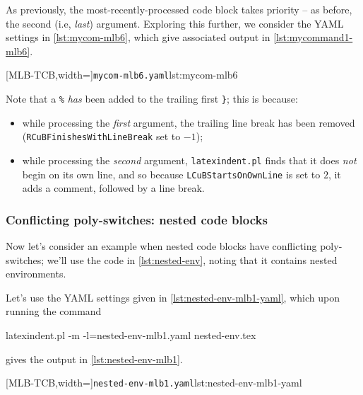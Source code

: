 	As previously, the most-recently-processed code block takes priority -- as before, the
	second (i.e, \emph{last}) argument. Exploring this further, we consider the YAML settings
	in \cref{lst:mycom-mlb6}, which give associated output in \cref{lst:mycommand1-mlb6}.

	\begin{cmhtcbraster}[raster column skip=.1\linewidth]
		[MLB-TCB,width=\linewidth]{\texttt{mycom-mlb6.yaml}}{lst:mycom-mlb6}
	\end{cmhtcbraster}

	Note that a \lstinline!%! \emph{has} been added to the trailing first \lstinline!}!; this
	is because:
	\begin{itemize}
		\item while processing the \emph{first} argument, the trailing line break has been removed
		      (\texttt{RCuBFinishesWithLineBreak} set to $-1$);
		\item while processing the \emph{second} argument, \texttt{latexindent.pl} finds that it does
		      \emph{not} begin on its own line, and so because \texttt{LCuBStartsOnOwnLine} is set to
		      $2$, it adds a comment, followed by a line break.
	\end{itemize}

\subsubsection{Conflicting poly-switches: nested code blocks}
	Now let's consider an example when nested code blocks have conflicting poly-switches;
	we'll use the code in \cref{lst:nested-env}, noting that it contains nested environments.


	Let's use the YAML settings given in \cref{lst:nested-env-mlb1-yaml}, which upon running
	the command  
	\begin{commandshell}
latexindent.pl -m -l=nested-env-mlb1.yaml nested-env.tex
\end{commandshell}
	gives the output in \cref{lst:nested-env-mlb1}.

	\begin{cmhtcbraster}[raster column skip=.05\linewidth]
		[MLB-TCB,width=\linewidth]{\texttt{nested-env-mlb1.yaml}}{lst:nested-env-mlb1-yaml}
	\end{cmhtcbraster}

